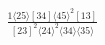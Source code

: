 \documentclass[varwidth, border=5pt]{standalone}
\begin{document}
\begin{my}
$\begin{gathered}
\scriptscriptstyle\frac{1⟨25⟩[34]⟨45⟩^2[13]}{[23]^2⟨24⟩^2⟨34⟩⟨35⟩}
\end{gathered}$
\end{my}
\end{document}
